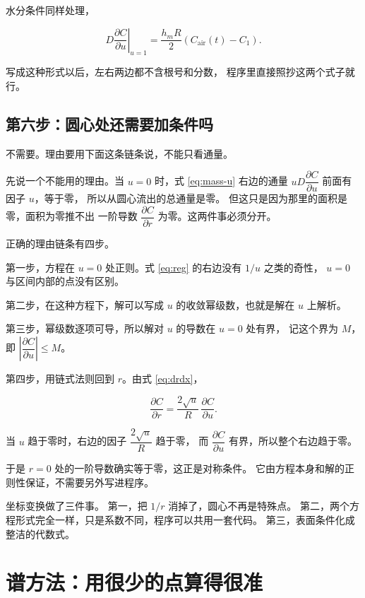 水分条件同样处理，

\begin{equation}
D\left.\frac{\partial C}{\partial u}\right|_{u=1}
= \frac{h_mR}{2}\left(C_{\mathrm{air}}(t)-C_1\right).
\label{eq:bcu-C}
\end{equation}

写成这种形式以后，左右两边都不含根号和分数，
程序里直接照抄这两个式子就行。

\subsection{第六步：圆心处还需要加条件吗}

不需要。理由要用下面这条链条说，不能只看通量。

先说一个不能用的理由。当 $u=0$ 时，式 \eqref{eq:mass-u} 右边的通量
$uD\dfrac{\partial C}{\partial u}$ 前面有因子 $u$，等于零，
所以从圆心流出的总通量是零。
但这只是因为那里的面积是零，面积为零推不出
一阶导数 $\dfrac{\partial C}{\partial r}$ 为零。这两件事必须分开。

正确的理由链条有四步。

第一步，方程在 $u=0$ 处正则。式 \eqref{eq:reg} 的右边没有 $1/u$ 之类的奇性，
$u=0$ 与区间内部的点没有区别。

第二步，在这种方程下，解可以写成 $u$ 的收敛幂级数，也就是解在 $u$ 上解析。

第三步，幂级数逐项可导，所以解对 $u$ 的导数在 $u=0$ 处有界，
记这个界为 $M$，即 $\left|\dfrac{\partial C}{\partial u}\right|\le M$。

第四步，用链式法则回到 $r$。由式 \eqref{eq:drdx}，

\begin{equation}
\frac{\partial C}{\partial r}
= \frac{2\sqrt{u}}{R}\,\frac{\partial C}{\partial u}.
\end{equation}

当 $u$ 趋于零时，右边的因子 $\dfrac{2\sqrt{u}}{R}$ 趋于零，
而 $\dfrac{\partial C}{\partial u}$ 有界，所以整个右边趋于零。

于是 $r=0$ 处的一阶导数确实等于零，这正是对称条件。
它由方程本身和解的正则性保证，不需要另外写进程序。

\keypoint
坐标变换做了三件事。
第一，把 $1/r$ 消掉了，圆心不再是特殊点。
第二，两个方程形式完全一样，只是系数不同，程序可以共用一套代码。
第三，表面条件化成整洁的代数式。

\section{谱方法：用很少的点算得很准}


